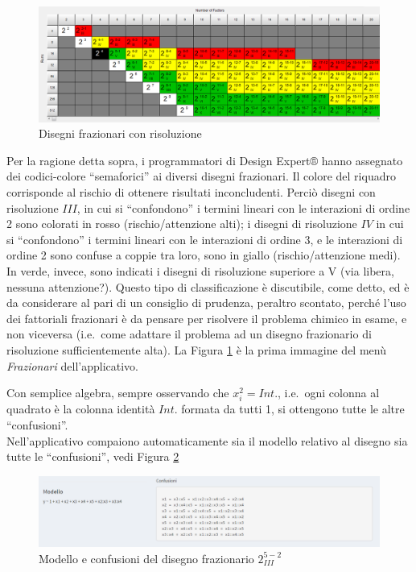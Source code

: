 \documentclass[
  11pt,
]{book}
\begin{document}
\begin{figure}[ht]

{\centering \includegraphics[width=1\linewidth]{Immagini/Fraz/02_risoluzione} 

}

\caption{Disegni frazionari con risoluzione}\label{fig:fz2}
\end{figure}

Per la ragione detta sopra, i programmatori di Design Expert® hanno assegnato dei codici-colore ``semaforici'' ai diversi disegni frazionari. Il colore del riquadro corrisponde al rischio di ottenere risultati inconcludenti. Perciò disegni con risoluzione \(III\), in cui si ``confondono'' i termini lineari con le interazioni di ordine 2 sono colorati in rosso (rischio/attenzione alti); i disegni di risoluzione \(IV\) in cui si ``confondono'' i termini lineari con le interazioni di ordine 3, e le interazioni di ordine 2 sono confuse a coppie tra loro, sono in giallo (rischio/attenzione medi). In verde, invece, sono indicati i disegni di risoluzione superiore a V (via libera, nessuna attenzione?). Questo tipo di classificazione è discutibile, come detto, ed è da considerare al pari di un consiglio di prudenza, peraltro scontato, perché l'uso dei fattoriali frazionari è da pensare per risolvere il problema chimico in esame, e non viceversa (i.e.~come adattare il problema ad un disegno frazionario di risoluzione sufficientemente alta).
La Figura \ref{fig:fz2} è la prima immagine del menù \emph{Frazionari} dell'applicativo.

Con semplice algebra, sempre osservando che \(x_i^2=Int.\), i.e.~ogni colonna al quadrato è la colonna identità \(Int.\) formata da tutti 1, si ottengono tutte le altre ``confusioni''.\\
Nell'applicativo compaiono automaticamente sia il modello relativo al disegno sia tutte le ``confusioni'', vedi Figura \ref{fig:fz3}

\begin{figure}[ht]

{\centering \includegraphics[width=1\linewidth]{Immagini/Fraz/03_confusioni} 

}

\caption{Modello e confusioni del disegno frazionario $2_{III}^{5-2}$}\label{fig:fz3}
\end{figure}
\end{document}
